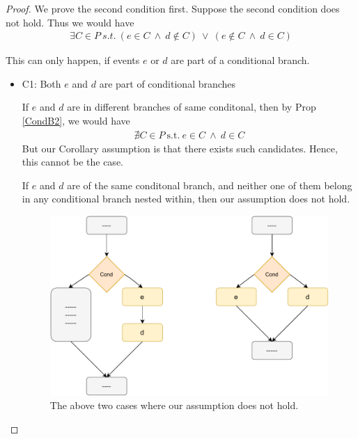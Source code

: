         \begin{proof}
        
            We prove the second condition first. 
            Suppose the second condition does not hold. Thus we would have
            \begin{align*}
                \exists C \in P \ s.t. \ 
                (e \in C \ \wedge \ d \notin C) \ \vee \ 
                (e \notin C \ \wedge \ d \in C)
            \end{align*}

            This can only happen, if events $e$ or $d$ are part of a conditional branch.
            \begin{itemize}
                \item C1: Both $e$ and $d$ are part of conditional branches

                    If $e$ and $d$ are in different branches of same conditonal, then by Prop \ref{CondB2}, we would have 
                    \begin{align*}
                        \nexists C \in P \ \text{s.t.} \ e \in C \ \wedge \ d \in C 
                    \end{align*}
                    But our Corollary assumption is that there exists such candidates. Hence, this cannot be the case.

                    If $e$ and $d$ are of the same conditonal branch, and neither one of them belong in any conditional branch nested within, then our assumption does not hold. 

                    \begin{figure}[H]
                        \centering 
                        \includegraphics[scale=0.5]{5.InstructionReordering/5.ValidReorderingProgram/ConditionalsProofFig1.pdf}
                        \caption{The above two cases where our assumption does not hold.}
                    \end{figure}


\end{itemize}
\end{proof}
